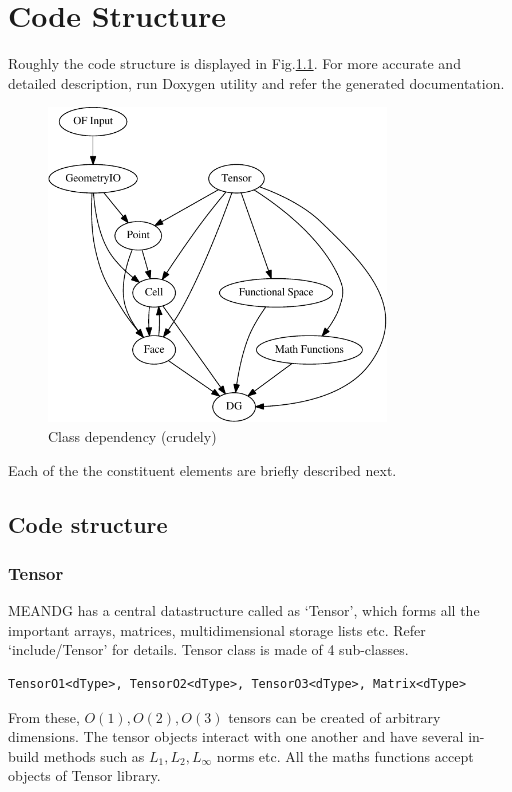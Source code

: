 \chapter{Code Structure}\label{structure}

Roughly the code structure is displayed in Fig.\ref{graph}. For more accurate and detailed description, run Doxygen utility and refer the generated documentation.


\begin{figure}[H]
	\begin{center}
		\includegraphics[width=0.8\textwidth]{graph.pdf}
		\caption{\label{graph} Class dependency (crudely)}
	\end{center}
\end{figure}

Each of the the constituent elements are briefly described next. 

\section{Code structure}
\subsection{Tensor}
MEANDG has a central datastructure called as `Tensor', which forms all the important arrays, matrices, multidimensional storage lists etc.
Refer `include/Tensor' for details. Tensor class is made of 4 sub-classes. 
\begin{verbatim}
TensorO1<dType>, TensorO2<dType>, TensorO3<dType>, Matrix<dType>
\end{verbatim}
From these, $O(1), O(2), O(3)$ tensors can be created of arbitrary dimensions. The tensor objects interact with one another and 
have several in-build methods such as $L_1, L_2, L_\infty$ norms etc. All the maths functions accept objects of Tensor library. 


